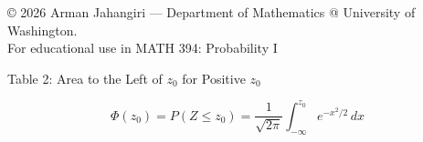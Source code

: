 \documentclass[11pt]{article}
\begin{document}
\begin{center}
{\footnotesize
© 2026 Arman Jahangiri — Department of Mathematics @ University of Washington.\\
For educational use in MATH 394: Probability I
}
\end{center}



\newpage



\begin{distbox}{Table 2: Area to the Left of $z_0$ for Positive $z_0$}

\[
\Phi(z_0)=P(Z\le z_0)
=
\frac{1}{\sqrt{2\pi}}
\int_{-\infty}^{z_0} e^{-x^2/2}\,dx
\]

\centering
\normalsize
\setlength{\tabcolsep}{7pt}
\renewcommand{\arraystretch}{0.75}


\end{distbox}
\end{document}
